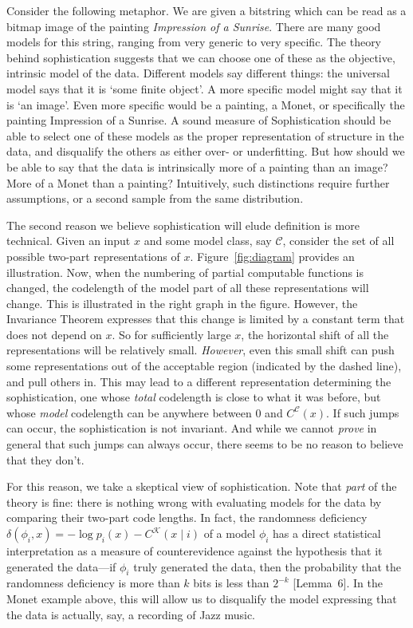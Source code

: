 \documentclass{style/llncs}
\newcommand{\C}{\mathscr C}
\newcommand{\K}{\mathscr K}
\begin{document}
Consider the following metaphor. We are given a bitstring which can be read as a bitmap image of the painting \emph{Impression of a Sunrise}. There are many good models for this string, ranging from very generic to very specific. The theory behind sophistication suggests that we can choose one of these as the objective, intrinsic model of the data. Different models say different things: the universal model says that it is `some finite object'. A more specific model might say that it is `an image'. Even more specific would be a painting, a Monet, or specifically the painting Impression of a Sunrise. A sound measure of Sophistication should be able to select one of these models as the proper representation of structure in the data, and disqualify the others as either over- or underfitting. But how should we be able to say that the data is intrinsically more of a painting than an image? More of a Monet than a painting? Intuitively, such distinctions require further assumptions, or a second sample from the same distribution.

The second reason we believe sophistication will elude definition is more technical. Given an input $x$ and some model class, say $\C$, consider the set of all possible two-part representations of $x$. Figure~\ref{fig:diagram} provides an illustration. Now, when the numbering of partial computable functions is changed, the codelength of the model part of all these representations will change. This is illustrated in the right graph in the figure. However, the Invariance Theorem expresses that this change is limited by a constant term that does not depend on $x$. So for sufficiently large $x$, the horizontal shift of all the representations will be relatively small. \emph{However}, even this small shift can push some representations out of the acceptable region (indicated by the dashed line), and pull others in. This may lead to a different representation determining the sophistication, one whose \emph{total} codelength is close to what it was before, but whose \emph{model} codelength can be anywhere between $0$ and $C^\C(x)$. If such jumps can occur, the sophistication is not invariant. And while we cannot \emph{prove} in general that such jumps can always occur, there seems to be no reason to believe that they don't.

For this reason, we take a skeptical view of sophistication. Note that \emph{part} of the theory is fine: there is nothing wrong with evaluating models for the data by comparing their two-part code lengths. In fact, the randomness deficiency $\delta(\phi_i,x)=-\log p_i(x)-C^\K(x\mid i)$ of a model $\phi_i$ has a direct statistical interpretation as a measure of counterevidence against the hypothesis that it generated the data---if $\phi_i$ truly generated the data, then the probability that the randomness deficiency is more than $k$ bits is less than $2^{-k}$ \cite{bloem2014safe}[Lemma~6]. In the Monet example above, this will allow us to disqualify the model expressing that the data is actually, say, a recording of Jazz music.
\end{document}
